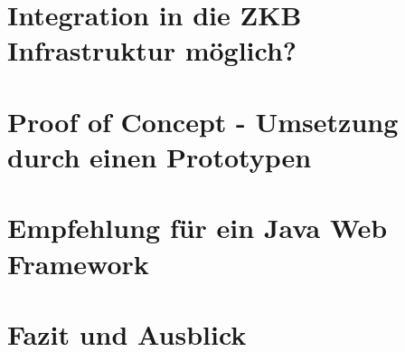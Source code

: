 \documentclass[
11pt, %
a4paper, %
BCOR25mm, %
DIV14, %
footsepline = false, %
headsepline, %
twoside, %
openright,
abstracton, %
listof=totocnumbered, %
bibliography=totocnumbered %
]{scrreprt}
\begin{document}
   
  
  \cleardoublepage
  
   
  \chapter{Integration in die ZKB Infrastruktur
  möglich?}\label{chapter:IntegrationInDieZkbInfrastrutkru}

  \cleardoublepage
  
  
  \chapter{Proof of Concept - Umsetzung durch einen
  Prototypen}\label{chapter:ProofOfConcept}

  \cleardoublepage  
  
   
  \chapter{Empfehlung für ein Java Web
  Framework}\label{chapter:EmpfehlungFuerEinJavaWebFramework}

  \cleardoublepage
  
   
  \chapter{Fazit und Ausblick}\label{chapter:FazitUndAusblick}

  \cleardoublepage
  
  
\end{document}
